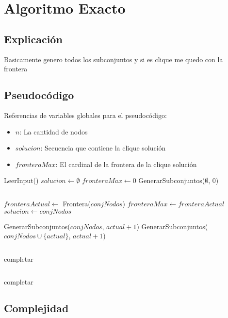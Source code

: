 \section{Algoritmo Exacto}

\subsection{Explicación}
Basicamente genero todos los subconjuntos y si es clique me quedo con la frontera

\subsection{Pseudocódigo}

Referencias de variables globales para el pseudocódigo:
\begin{itemize}
    \item $n$: La cantidad de nodos
    \item $solucion$: Secuencia que contiene la clique solución
    \item $fronteraMax$: El cardinal de la frontera de la clique solución
\end{itemize}

\begin{algorithm}[H]
\begin{algorithmic}

    \State LeerInput()
    \State $solucion \gets \emptyset$
    \State $fronteraMax \gets 0$
    \State GenerarSubconjuntos($\emptyset$, $0$)
\EndFunction

$ $\newline


            \State $fronteraActual \gets$ Frontera($conjNodos$)
                \State $fronteraMax \gets fronteraActual$
                \State $solucion \gets conjNodos$
            \EndIf
        \EndIf

    \Else
        \State GenerarSubconjuntos($conjNodos$, $actual + 1$)
        \State GenerarSubconjuntos($conjNodos \cup \{actual\}$, $actual + 1$)
    \EndIf

\EndFunction


$ $\newline

    \State completar
\EndFunction

$ $\newline

    \State completar
\EndFunction

\end{algorithmic}
\end{algorithm}



\subsection{Complejidad}
